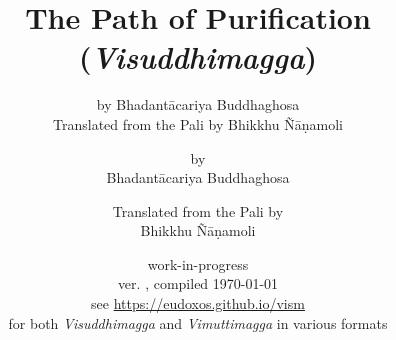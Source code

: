 


	\title{The Path of Purification \\ (\emph{Visuddhimagga})}
	\date{work-in-progress \\ ver. \vismCommitHref, compiled \today \\ see \url{https://eudoxos.github.io/vism}  \\ for both \emph{Visuddhimagga} and \emph{Vimuttimagga} in various formats}
	\ifplastex
		\author{by Bhadantācariya Buddhaghosa \\ Translated from the Pali by Bhikkhu Ñāṇamoli}
	\else
		\author{by \\ Bhadantācariya Buddhaghosa \and Translated from the Pali by \\ Bhikkhu Ñāṇamoli}
	\fi
	\maketitle

	\frontmatter
		\bgroup
			\ifplastex\else\renewcommand{\baselinestretch}{0.2}\normalsize\fi
			\tableofcontents
		\egroup
		
	\backmatter
		
		

